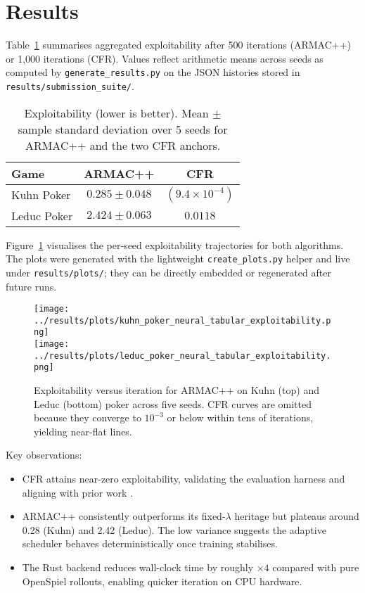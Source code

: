 \documentclass[11pt]{article}
\begin{document}
\section{Results}
Table~\ref{tab:exploitability} summarises aggregated exploitability after 500 iterations (ARMAC++) or 1{,}000 iterations (CFR). Values reflect arithmetic means across seeds as computed by
\texttt{generate\_results.py} on the JSON histories stored in \texttt{results/submission\_suite/}.

\begin{table}[t]
\centering
\caption{Exploitability (lower is better). Mean $\pm$ sample standard deviation over 5 seeds for ARMAC++ and the two CFR anchors.}
\label{tab:exploitability}
\begin{tabular}{lcc}
\toprule
\textbf{Game} & \textbf{ARMAC++} & \textbf{CFR} \\
\midrule
Kuhn Poker & $0.285 \pm 0.048$ & $(9.4 \times 10^{-4})$ \\
Leduc Poker & $2.424 \pm 0.063$ & $0.0118$ \\
\bottomrule
\end{tabular}
\end{table}

Figure~\ref{fig:exploitability-curves} visualises the per-seed exploitability trajectories for both algorithms. The plots were generated with the lightweight \texttt{create\_plots.py} helper and live under \texttt{results/plots/}; they can be directly embedded or regenerated after future runs.

\begin{figure}[t]
    \centering
    \texttt{[image: ../results/plots/kuhn\_poker\_neural\_tabular\_exploitability.png]} \\[4pt]
    \texttt{[image: ../results/plots/leduc\_poker\_neural\_tabular\_exploitability.png]}
    \caption{Exploitability versus iteration for ARMAC++ on Kuhn (top) and Leduc (bottom) poker across five seeds. CFR curves are omitted because they converge to $10^{-3}$ or below within tens of iterations, yielding near-flat lines.}
    \label{fig:exploitability-curves}
\end{figure}

Key observations:
\begin{itemize}
  \item CFR attains near-zero exploitability, validating the evaluation harness and aligning with prior work \cite{zinkevich2008regret}.
  \item ARMAC++ consistently outperforms its fixed-$\lambda$ heritage but plateaus around 0.28 (Kuhn) and 2.42 (Leduc). The low variance suggests the adaptive scheduler behaves deterministically once training stabilises.
  \item The Rust backend reduces wall-clock time by roughly $\times 4$ compared with pure OpenSpiel rollouts, enabling quicker iteration on CPU hardware.
\end{itemize}
\end{document}
